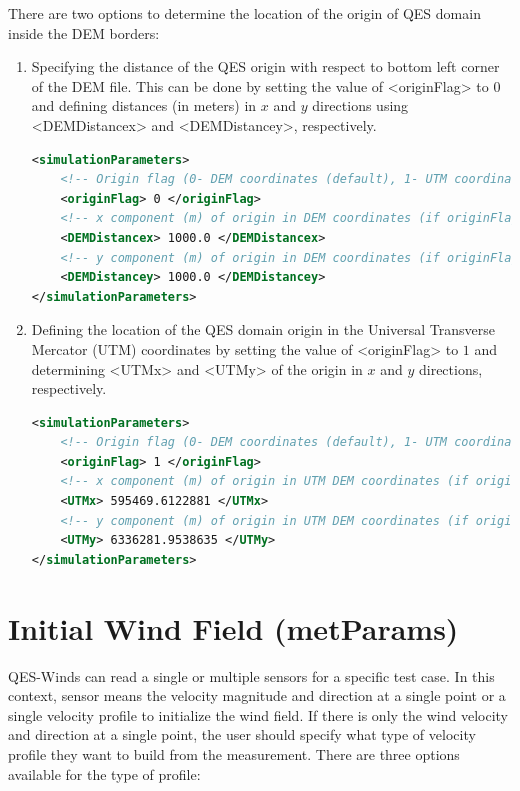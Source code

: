 There are two options to determine the location of the origin of QES domain inside the DEM borders:

\begin{enumerate}
\item Specifying the distance of the QES origin with respect to bottom left corner of the DEM file. This can be done by setting the value of <originFlag> to $0$ and defining distances (in meters) in $x$ and $y$ directions using <DEMDistancex> and <DEMDistancey>, respectively.

\begin{lstlisting}[language=XML]
<simulationParameters>
	<!-- Origin flag (0- DEM coordinates (default), 1- UTM coordinates) -->
	<originFlag> 0 </originFlag>		
	<!-- x component (m) of origin in DEM coordinates (if originFlag = 0) -->		
	<DEMDistancex> 1000.0 </DEMDistancex> 		
	<!-- y component (m) of origin in DEM coordinates (if originFlag = 0) -->	
	<DEMDistancey> 1000.0 </DEMDistancey> 				
</simulationParameters>
\end{lstlisting}

\item Defining the location of the QES domain origin in the Universal Transverse Mercator (UTM) coordinates by setting the value of <originFlag> to $1$ and determining <UTMx> and <UTMy> of the origin in $x$ and $y$ directions, respectively.

\begin{lstlisting}[language=XML]
<simulationParameters>
	<!-- Origin flag (0- DEM coordinates (default), 1- UTM coordinates) -->
	<originFlag> 1 </originFlag>	
	<!-- x component (m) of origin in UTM DEM coordinates (if originFlag = 1)-->				
	<UTMx> 595469.6122881 </UTMx>
	<!-- y component (m) of origin in UTM DEM coordinates (if originFlag = 1)--> 			
	<UTMy> 6336281.9538635 </UTMy> 					
</simulationParameters>
\end{lstlisting}

\end{enumerate}


\section{Initial Wind Field (metParams)}

QES-Winds can read a single or multiple sensors for a specific test case. In this context, sensor means the velocity magnitude and direction at a single point or a single velocity profile to initialize the wind field. If there is only the wind velocity and direction at a single point, the user should specify what type of velocity profile they want to build from the measurement. There are three options available for the type of profile:

